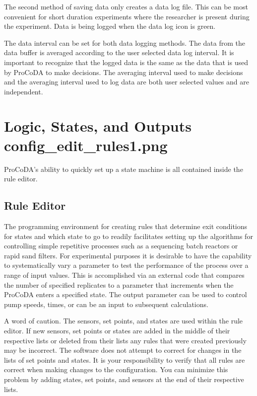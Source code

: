 \documentclass[letterpaper,10pt,english]{sphinxmanual}
\begin{document}
The second method of saving data only creates a data log file. This can be most convenient for short duration experiments where the researcher is present during the experiment. Data is being logged when the data log icon is green. 

The data interval can be set for both data logging methods. The data from the data buffer is averaged according to the user selected data log interval. It is important to recognize that the logged data is  the same as the data that is used by ProCoDA to make decisions. The averaging interval used to make decisions and the averaging interval used to log data are both user selected values and are independent.


\section[Logic, States, and Outputs]{Logic, States, and Outputs \lowercase{\sphinxincludegraphics}{{config_edit_rules1}.png}}
\label{\detokenize{ProCoDA/ProCoDA:logic-states-and-outputs-config-edit-rules}}\label{\detokenize{ProCoDA/ProCoDA:heading-procoda-logic}}
ProCoDA’s ability to quickly set up a state machine is all contained inside the rule editor.


\subsection{Rule Editor}
\label{\detokenize{ProCoDA/ProCoDA:rule-editor}}\label{\detokenize{ProCoDA/ProCoDA:heading-procoda-rule-editor}}
The programming environment for creating rules that determine exit conditions for states and which state to go to readily facilitates setting up the algorithms for controlling simple repetitive processes such as a sequencing batch reactors or rapid sand filters. For experimental purposes it is desirable to have the capability to systematically vary a parameter to test the performance of the process over a range of input values. This is accomplished via an external code that compares the number of specified replicates to a parameter that increments when the ProCoDA enters a specified state. The output parameter can be used to control pump speeds, times, or can be an input to subsequent calculations.

A word of caution. The sensors, set points, and states are used within the rule editor. If new sensors, set points or states are added in the middle of their respective lists or deleted from their lists any rules that were created previously may be incorrect. The software does not attempt to correct for changes in the lists of set points and states. It is your responsibility to verify that all rules are correct when making changes to the configuration. You can minimize this problem by adding states, set points, and sensors at the end of their respective lists.
\end{document}
